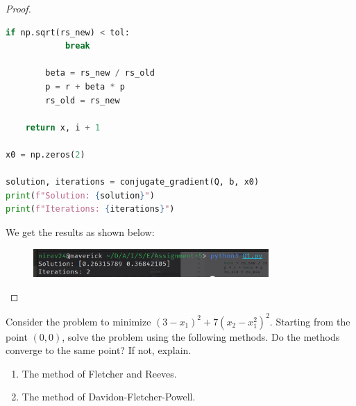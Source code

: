 \documentclass{article}
\begin{document}
\begin{proof}
\begin{lstlisting}[language=Python]
        if np.sqrt(rs_new) < tol:
            break
        
        beta = rs_new / rs_old
        p = r + beta * p
        rs_old = rs_new
    
    return x, i + 1  

x0 = np.zeros(2)

solution, iterations = conjugate_gradient(Q, b, x0)
print(f"Solution: {solution}")
print(f"Iterations: {iterations}")
\end{lstlisting}

We get the results as shown below:

\begin{figure}[H]
    \centering
    \includegraphics[width=0.8\textwidth]{Images/Q1.png}
\end{figure}
\end{proof}

\begin{question*}[2]
    Consider the problem to minimize \( (3 - x_1)^2 + 7(x_2 - x_1^2)^2 \). Starting from the point \( (0, 0) \), solve the problem using the following methods. Do the methods converge to the same point? If not, explain.

    \begin{enumerate}[label=(\alph*)]
        \item The method of Fletcher and Reeves.
        \item The method of Davidon-Fletcher-Powell.
    \end{enumerate}
\end{question*}
\end{document}
